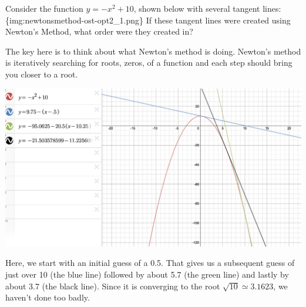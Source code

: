 \documentclass{ximera}
\author{Emma Smith Zbarsky}
\begin{document}
\begin{exercise}

Consider the function $y=-x^2+10$, shown below with several tangent
lines: \{img:newtonsmethod-ost-opt2\_1.png\} If these tangent lines were
created using Newton's Method, what order were they created in?


\begin{hint}
The key here is to think about what Newton's method is doing. Newton's
method is iteratively searching for roots, zeros, of a function and each
step should bring you closer to a root.
\end{hint}


\begin{hint}
\begin{image}\includegraphics{newtonsmethod-ost-opt2.png}\end{image}



Here, we start with an initial guess of a 0.5. That gives us a
subsequent guess of just over 10 (the blue line) followed by about 5.7
(the green line) and lastly by about 3.7 (the black line). Since it is
converging to the root $\sqrt{10} \simeq 3.1623$, we haven't done too
badly.
\end{hint}


\begin{multipleChoice}
\end{multipleChoice}

\end{exercise}
\end{document}
